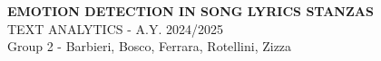 \documentclass[12pt,openany]{report}
\begin{document}
\justify

\setcounter{page}{1}

\begin{flushright}
  \large{\textbf{EMOTION DETECTION IN SONG LYRICS STANZAS}}\\
  TEXT ANALYTICS - A.Y. 2024/2025\\
  Group 2 - Barbieri, Bosco, Ferrara, Rotellini, Zizza
\end{flushright}






% 
% 




% 


% 






\clearpage

% 
% 
% 
\printbibliography
\renewcommand{\listfigurename}{List of figures}
\listoffigures

\end{document}
